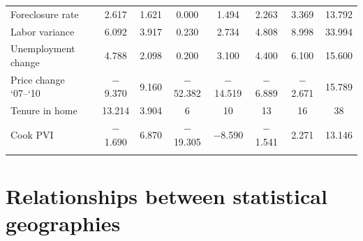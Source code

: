 \documentclass[12pt,oneside]{psthesis}
\begin{document}
\begin{table}[!htbp]
\begin{tabular}{@{\extracolsep{5pt}}lccccccc}
Foreclosure rate & 2.617 & 1.621 & 0.000 & 1.494 & 2.263 & 3.369 & 13.792 \\ 
Labor variance & 6.092 & 3.917 & 0.230 & 2.734 & 4.808 & 8.998 & 33.994 \\ 
Unemployment change & 4.788 & 2.098 & 0.200 & 3.100 & 4.400 & 6.100 & 15.600 \\ 
Price change `07--`10 & $-$9.370 & 9.160 & $-$52.382 & $-$14.519 & $-$6.889 & $-$2.671 & 15.789 \\ 
Tenure in home & 13.214 & 3.904 & 6 & 10 & 13 & 16 & 38 \\ 
Cook PVI & $-$1.690 & 6.870 & $-$19.305 & $-$8.590 & $-$1.541 & 2.271 & 13.146 \\ 
\hline \\[-1.8ex] 
\end{tabular} 
\end{table}
\hypertarget{census-geography}{%
\section{Relationships between statistical geographies}\label{census-geography}}
\end{document}
